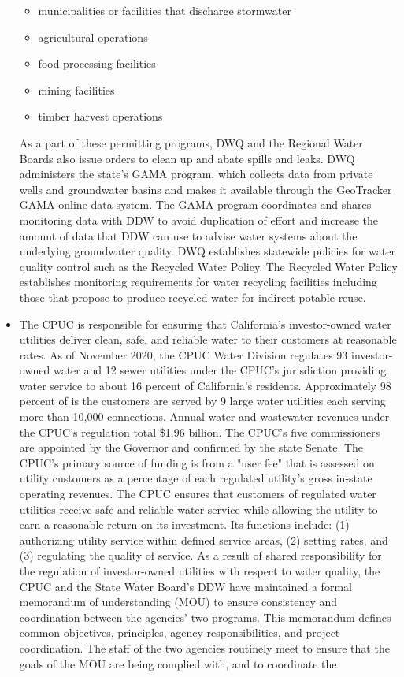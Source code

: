 \begin{itemize}
\begin{itemize}
\item municipalities or facilities that discharge stormwater
\item agricultural operations
\item food processing facilities
\item mining facilities
\item timber harvest operations
\end{itemize}
As a part of these permitting programs, DWQ and the Regional Water Boards also issue orders to clean up and abate spills and leaks.
DWQ administers the state’s GAMA program, which collects data from private wells and groundwater basins and makes it available through the GeoTracker GAMA online data system. The GAMA program coordinates and shares monitoring data with DDW to avoid duplication of effort and increase the amount of data that DDW can use to advise water systems about the underlying groundwater quality.
DWQ establishes statewide policies for water quality control such as the Recycled Water Policy. The Recycled Water Policy establishes monitoring requirements for water recycling facilities including those that propose to produce recycled water for indirect potable reuse.
\item The CPUC is responsible for ensuring that California’s investor-owned water utilities deliver clean, safe, and reliable water to their customers at reasonable rates. As of November 2020, the CPUC Water Division regulates 93 investor-owned water and 12 sewer utilities under the CPUC’s jurisdiction providing water service to about 16 percent of California’s residents. Approximately 98 percent of is the customers are served by 9 large water utilities each serving more than 10,000 connections. Annual water and wastewater revenues under the CPUC’s regulation total \$1.96 billion.
The CPUC's five commissioners are appointed by the Governor and confirmed by the state Senate. The CPUC's primary source of funding is from a "user fee" that is assessed on utility customers as a percentage of each regulated utility’s gross in-state operating revenues.
The CPUC ensures that customers of regulated water utilities receive safe and reliable water service while allowing the utility to earn a reasonable return on its investment. Its functions include: (1) authorizing utility service within defined service areas, (2) setting rates, and (3) regulating the quality of service.
As a result of shared responsibility for the regulation of investor-owned utilities with respect to water quality, the CPUC and the State Water Board’s DDW have maintained a formal memorandum of understanding (MOU) to ensure consistency and coordination between the agencies’ two programs. This memorandum defines common objectives, principles, agency responsibilities, and project coordination. The staff of the two agencies routinely meet to ensure that the goals of the MOU are being complied with, and to coordinate the

\end{itemize}
